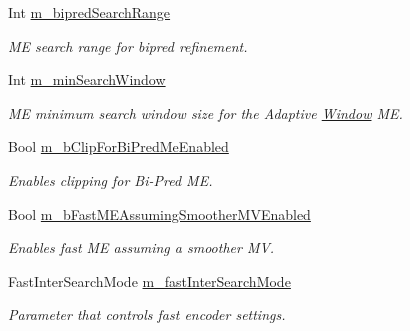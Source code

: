 \begin{DoxyCompactItemize}
\mbox{\label{class_t_app_enc_cfg_a426f2e7e8efa1d814aa4daa8d620d1e2}} 
Int \hyperlink{class_t_app_enc_cfg_a426f2e7e8efa1d814aa4daa8d620d1e2}{m\+\_\+bipred\+Search\+Range}
\begin{DoxyCompactList}\small\item\em ME search range for bipred refinement. \end{DoxyCompactList}\item 
\mbox{\label{class_t_app_enc_cfg_ac46f81548f9165d72e784e1fac5ee9e1}} 
Int \hyperlink{class_t_app_enc_cfg_ac46f81548f9165d72e784e1fac5ee9e1}{m\+\_\+min\+Search\+Window}
\begin{DoxyCompactList}\small\item\em ME minimum search window size for the Adaptive \hyperlink{class_window}{Window} ME. \end{DoxyCompactList}\item 
\mbox{\label{class_t_app_enc_cfg_a44e4bd57972aaebd920d8d1f72877b98}} 
Bool \hyperlink{class_t_app_enc_cfg_a44e4bd57972aaebd920d8d1f72877b98}{m\+\_\+b\+Clip\+For\+Bi\+Pred\+Me\+Enabled}
\begin{DoxyCompactList}\small\item\em Enables clipping for Bi-\/\+Pred ME. \end{DoxyCompactList}\item 
\mbox{\label{class_t_app_enc_cfg_adfbdd680bfac41dfab0723e28181dcea}} 
Bool \hyperlink{class_t_app_enc_cfg_adfbdd680bfac41dfab0723e28181dcea}{m\+\_\+b\+Fast\+M\+E\+Assuming\+Smoother\+M\+V\+Enabled}
\begin{DoxyCompactList}\small\item\em Enables fast ME assuming a smoother MV. \end{DoxyCompactList}\item 
\mbox{\label{class_t_app_enc_cfg_a3f8e007d216b1b789c10486a15357e69}} 
Fast\+Inter\+Search\+Mode \hyperlink{class_t_app_enc_cfg_a3f8e007d216b1b789c10486a15357e69}{m\+\_\+fast\+Inter\+Search\+Mode}
\begin{DoxyCompactList}\small\item\em Parameter that controls fast encoder settings. \end{DoxyCompactList}\item 

\end{DoxyCompactItemize}
